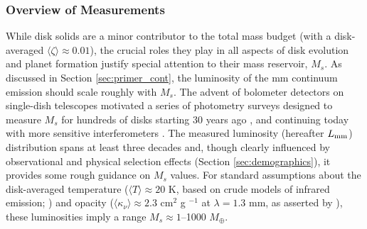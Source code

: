 \documentclass[a4paper]{ar-1col}
\begin{document}
\subsubsection{Overview of Measurements}
While disk solids are a minor contributor to the total mass budget (with a disk-averaged $\langle \zeta \rangle \approx 0.01$), the crucial roles they play in all aspects of disk evolution and planet formation justify special attention to their mass reservoir, $M_s$.  As discussed in Section \ref{sec:primer_cont}, the luminosity of the mm continuum emission should scale roughly with $M_s$.  The advent of bolometer detectors on single-dish telescopes motivated a series of photometry surveys designed to measure $M_s$ for hundreds of disks starting 30 years ago \citep{weintraub89,beckwith90,andre94,osterloh95,aw05,aw07b}, and continuing today with more sensitive interferometers \citep[e.g.,][]{andrews13,ansdell16,cieza19}.  The measured luminosity (hereafter $L_{\rm mm}$) distribution spans at least three decades and, though clearly influenced by observational and physical selection effects (Section \ref{sec:demographics}), it provides some rough guidance on $M_s$ values.  For standard assumptions about the disk-averaged temperature ($\langle T \rangle \approx 20$ K, based on crude models of infrared emission; \citealt{aw05}) and opacity ($\langle \kappa_\nu \rangle \approx 2.3$ cm$^2$ g $^{-1}$ at $\lambda = 1.3$ mm, as asserted by \citealt{beckwith90}), these luminosities imply a range $M_s \approx 1$--1000 $M_\oplus$.
\end{document}
